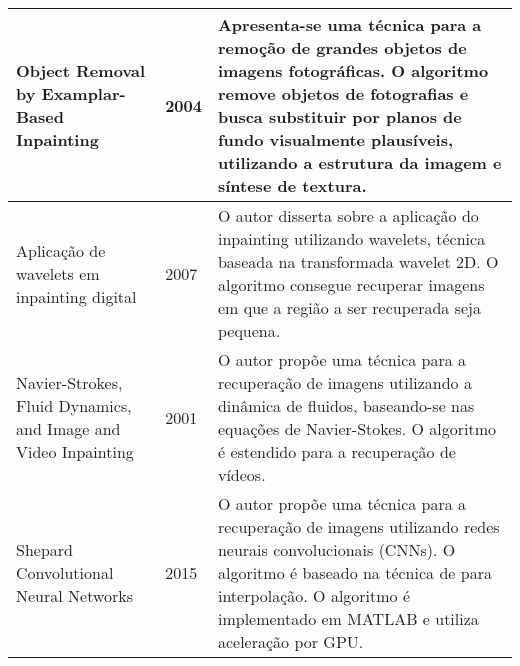 \begin{longtable}{|p{4cm}|l|p{10cm}|}
\hline

Object Removal by Examplar-Based Inpainting \cite{criminisi2004region} & 2004 & Apresenta-se uma técnica para a remoção de grandes objetos de imagens fotográficas. O algoritmo remove objetos de fotografias e busca substituir por planos de fundo visualmente plausíveis, utilizando a estrutura da imagem e síntese de textura. \\

\hline

Aplicação de wavelets em inpainting digital \cite{ubirata2007aplicacao} & 2007 & O autor disserta sobre a aplicação do inpainting utilizando wavelets, técnica baseada na transformada wavelet 2D. O algoritmo consegue recuperar imagens em que a região a ser recuperada seja pequena. \\

\hline

Navier-Strokes, Fluid Dynamics, and Image and Video Inpainting \cite{Bertalmio2001navier} & 2001 & O autor propõe uma técnica para a recuperação de imagens utilizando a dinâmica de fluidos, baseando-se nas equações de Navier-Stokes. O algoritmo é estendido para a recuperação de vídeos. \\

\hline

Shepard Convolutional Neural Networks \cite{ren2015shepard} & 2015 & O autor propõe uma técnica para a recuperação de imagens utilizando redes neurais convolucionais (CNNs). O algoritmo é baseado na técnica de \cite{shepard1968two} para interpolação. O algoritmo é implementado em MATLAB e utiliza aceleração por GPU. \\



\hline





\end{longtable}






